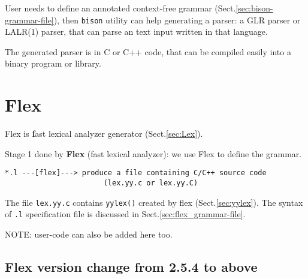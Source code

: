 User needs to define an annotated context-free grammar
(Sect.\ref{sec:bison-grammar-file}), then \verb!bison! utility can help
generating a parser: a GLR parser or LALR(1) parser, that can parse an text
input written in that language.

The generated parser is in C or C++ code, that can be compiled easily into a
binary program or library.

\section{Flex}
\label{sec:Flex}

Flex is {\bf f}ast lexical analyzer generator (Sect.\ref{sec:Lex}). 

Stage 1 done by {\bf Flex} (fast lexical analyzer): we use Flex to
define the grammar.

\begin{verbatim}
*.l ---[flex]---> produce a file containing C/C++ source code 
                       (lex.yy.c or lex.yy.C)
\end{verbatim}

The file \verb!lex.yy.c! contains \verb!yylex()! created by flex (Sect.\ref{sec:yylex}).
The syntax of \verb!.l! specification file is discussed in
Sect.\ref{sec:flex_grammar-file}.
  
NOTE: user-code can also be added here too.

\subsection{Flex version change from 2.5.4 to above}

